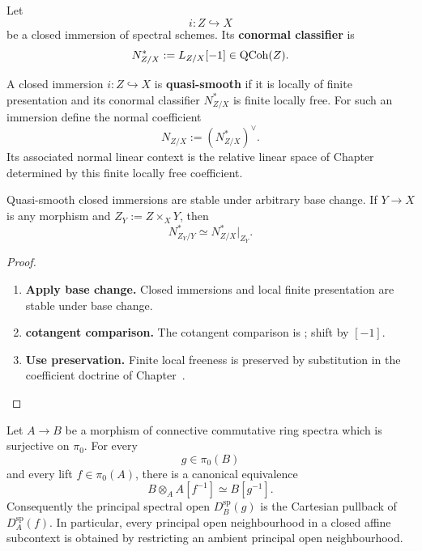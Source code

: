 \begin{definition}
\label{def:conormal-classifier}
Let
\[
    i:Z\hookrightarrow X
\]
be a closed immersion of spectral schemes. Its \textbf{conormal classifier} is
\[
    N^*_{Z/X}
    :=
    L_{Z/X}[-1]
    \in
    \operatorname{QCoh}(Z).
\]
\end{definition}

\begin{definition}
\label{def:quasi-smooth-closed-context}
A closed immersion \(i:Z\hookrightarrow X\) is \textbf{quasi-smooth} if it is
locally of finite presentation and its conormal classifier
\(N^*_{Z/X}\) is finite locally free. For such an immersion define the normal
coefficient
\[
    N_{Z/X}:=(N^*_{Z/X})^\vee.
\]
Its associated normal linear context is the relative linear space of
Chapter~ determined by this finite
locally free coefficient.
\end{definition}

\begin{proposition}
\label{prop:quasi-smooth-base-change}
Quasi-smooth closed immersions are stable under arbitrary base change. If
\(Y\to X\) is any morphism and \(Z_Y:=Z\times_XY\), then
\[
    N^*_{Z_Y/Y}
    \simeq
    N^*_{Z/X}|_{Z_Y}.
\]
\end{proposition}

\begin{proof}
\leavevmode
\begin{enumerate}[label=\textup{(\arabic*)}]
    \item \textbf{Apply base change.}
    Closed immersions and local finite presentation are stable under base change.

    \item \textbf{cotangent comparison.}
    The cotangent comparison is ; shift by \([-1]\).

    \item \textbf{Use preservation.}
    Finite local freeness is preserved by substitution in the coefficient doctrine of
    Chapter~.
\end{enumerate}
\end{proof}

\begin{lemma}
\label{lem:closed-immersion-principal-open-lifting}
Let \(A\to B\) be a morphism of connective commutative ring spectra which is
surjective on \(\pi_0\). For every
\[
    g\in\pi_0(B)
\]
and every lift \(f\in\pi_0(A)\), there is a canonical equivalence
\[
    B\otimes_AA[f^{-1}]
    \simeq
    B[g^{-1}].
\]
Consequently the principal spectral open \(D_B^{\mathrm{sp}}(g)\) is the
Cartesian pullback of \(D_A^{\mathrm{sp}}(f)\). In particular, every
principal open neighbourhood in a closed affine subcontext is obtained by
restricting an ambient principal open neighbourhood.
\end{lemma}

